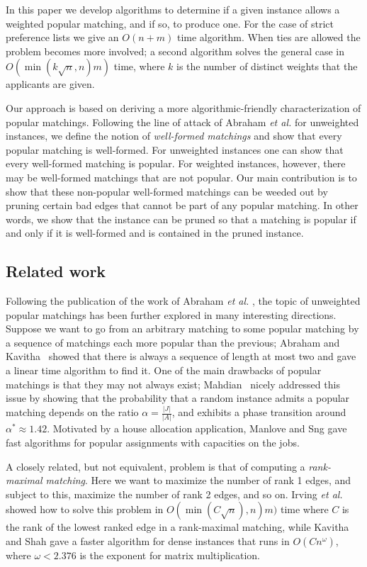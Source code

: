\documentclass[11pt]{article}
\newcommand{\etal} {{\it et al. }}
\begin{document}
In this paper we develop algorithms to determine if a given instance allows a weighted popular matching, and if so, to produce one. For the case of strict preference lists we give an $O(n+m)$ time algorithm. When ties are allowed the problem becomes more involved; a second algorithm solves the general case in $O( \min ( k \sqrt{n}, n) m)$ time, where $k$ is the number of distinct weights that the applicants are given.

Our approach is based on deriving a more algorithmic-friendly characterization of popular matchings. Following the line of attack of Abraham \etal \cite{AIKM05} for unweighted instances, we define the notion of \emph{well-formed matchings} and show that every popular matching is well-formed. For unweighted instances one can show \cite{AIKM05} that every well-formed matching is popular. For weighted instances, however, there may be well-formed matchings that are not popular. Our main contribution is to show that these non-popular well-formed matchings can be weeded out by pruning certain bad edges that cannot be part of any popular matching. In other words, we show that the instance can be pruned so that a matching is popular if and only if it is well-formed and is contained in the pruned instance.

\subsection{Related work}

Following the publication of the work of Abraham \etal \cite{AIKM05}, the topic of unweighted popular matchings has been further explored in many interesting directions. Suppose we want to go from an arbitrary matching to some popular matching by a sequence of matchings each more popular than the previous; Abraham and Kavitha~\cite{AK06} showed that there is always a sequence of length at most two and gave a linear time algorithm to find it. One of the main drawbacks of popular matchings is that they may not always exist; Mahdian~\cite{M06} nicely addressed this issue by showing that the probability that a random instance admits a popular matching depends on the ratio $\alpha = \frac{|J|}{|A|}$, and exhibits a phase transition around $\alpha^* \approx 1.42$. Motivated by a house allocation application, Manlove and Sng \cite{MS06} gave fast algorithms for popular assignments with capacities on the jobs.

A closely related, but not equivalent, problem is that of computing a \emph{rank-maximal matching}. Here we want to maximize the number of rank 1 edges, and subject to this, maximize the number of rank 2 edges, and so on. Irving \etal \cite{IKMMP06} showed how to solve this problem in $O( \min(C \sqrt{n}), n) m)$ time where $C$ is the rank of the lowest ranked edge in a rank-maximal matching, while Kavitha and Shah \cite{KS06} gave a faster algorithm for dense instances that runs in $O(Cn^\omega)$, where $\omega < 2.376$ is the exponent for matrix multiplication.
\end{document}
